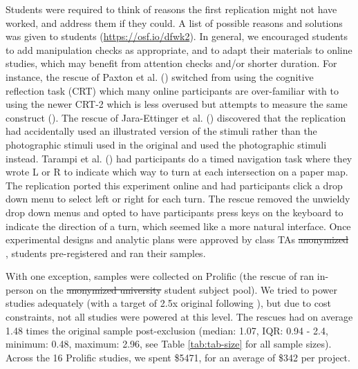 \documentclass[
  english,
  a4paper,
]{article}
\providecommand{\DIFaddtex}[1]{{\protect\color{blue}\uwave{#1}}} %
\providecommand{\DIFdeltex}[1]{{\protect\color{red}\sout{#1}}}                      %
\providecommand{\DIFaddbegin}{} %
\providecommand{\DIFaddend}{} %
\providecommand{\DIFdelbegin}{} %
\providecommand{\DIFdelend}{} %
\providecommand{\DIFadd}[1]{\texorpdfstring{\DIFaddtex{#1}}{#1}} %
\providecommand{\DIFdel}[1]{\texorpdfstring{\DIFdeltex{#1}}{}} %
\newcommand{\DIFscaledelfig}{0.5}
\newlength{\DIFdelgraphicswidth} %
\newlength{\DIFdelgraphicsheight} %
\newcommand{\DIFaddincludegraphics}[2][]{{\color{blue}\fbox{\DIFOincludegraphics[#1]{#2}}}} %
\newcommand{\DIFdelincludegraphics}[2][]{%
\sbox{\DIFdelgraphicsbox}{\DIFOincludegraphics[#1]{#2}}%
\settoboxwidth{\DIFdelgraphicswidth}{\DIFdelgraphicsbox} %
\settoboxtotalheight{\DIFdelgraphicsheight}{\DIFdelgraphicsbox} %
\scalebox{\DIFscaledelfig}{%
\parbox[b]{\DIFdelgraphicswidth}{\usebox{\DIFdelgraphicsbox}\\[-\baselineskip] \rule{\DIFdelgraphicswidth}{0em}}\llap{\resizebox{\DIFdelgraphicswidth}{\DIFdelgraphicsheight}{%
\setlength{\unitlength}{\DIFdelgraphicswidth}%
\begin{picture}(1,1)%
\thicklines\linethickness{2pt} %
{\color[rgb]{1,0,0}\put(0,0){\framebox(1,1){}}}%
{\color[rgb]{1,0,0}\put(0,0){\line( 1,1){1}}}%
{\color[rgb]{1,0,0}\put(0,1){\line(1,-1){1}}}%
\end{picture}%
}\hspace*{3pt}}} %
} %
\DeclareRobustCommand{\DIFaddbegin}{\DIFOaddbegin \let\includegraphics\DIFaddincludegraphics} %
\DeclareRobustCommand{\DIFaddend}{\DIFOaddend \let\includegraphics\DIFOincludegraphics} %
\DeclareRobustCommand{\DIFdelbegin}{\DIFOdelbegin \let\includegraphics\DIFdelincludegraphics} %
\DeclareRobustCommand{\DIFdelend}{\DIFOaddend \let\includegraphics\DIFOincludegraphics} %
\begin{document}
Students were required to think of reasons the first replication might not have worked, and address them if they could.
A list of possible reasons and solutions was given to students (\url{https://osf.io/dfwk2}).
In general, we encouraged students to add manipulation checks as appropriate, and to adapt their materials to online studies, which may benefit from attention checks and/or shorter duration.
For instance, the rescue of Paxton et al. () switched from using the cognitive reflection task (CRT) which many online participants are over-familiar with to using the newer CRT-2 which is less overused but attempts to measure the same construct ().
The rescue of Jara-Ettinger et al. () discovered that the replication had accidentally used an illustrated version of the stimuli rather than the photographic stimuli used in the original and used the photographic stimuli instead.
Tarampi et al. () had participants do a timed navigation task where they wrote L or R to indicate which way to turn at each intersection on a paper map. The replication ported this experiment online and had participants click a drop down menu to select left or right for each turn. The rescue removed the unwieldy drop down menus and opted to have participants press keys on the keyboard to indicate the direction of a turn, which seemed like a more natural interface.
Once experimental designs and analytic plans were approved by class TAs \DIFdelbegin %
\DIFdel{anonymized}%
\DIFdelend \DIFaddbegin \DIFadd{(VB and BP)}\DIFaddend , students pre-registered and ran their samples.

With one exception, samples were collected on Prolific (the rescue of  ran in-person on the \DIFdelbegin %
\DIFdel{anonymized university}%
\DIFdelend \DIFaddbegin \DIFadd{Stanford }\DIFaddend student subject pool).
We tried to power studies adequately (with a target of 2.5x original following ), but due to cost constraints, not all studies were powered at this level.
The rescues had on average 1.48 times the original sample post-exclusion (median: 1.07, IQR: 0.94 - 2.4, minimum: 0.48, maximum: 2.96, see Table \ref{tab:tab-size} for all sample sizes).
Across the 16 Prolific studies, we spent \$5471, for an average of \$342 per project.
\end{document}
